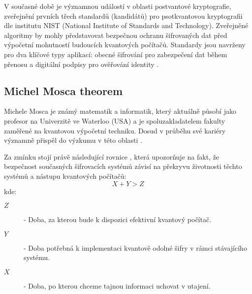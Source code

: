 V současné době je významnou událostí v oblasti postvantové kryptografie, zveřejnění prvních třech standardů (kandidátů) pro psotkvantovou kryptografii dle institutu NIST (National Institute of Standards and Technology). Zveřejněné algoritmy by mohly představovat bezpečnou ochranu šifrovaných dat před výpočetní mohutností budoucích kvantových počítačů. Standardy jsou navrženy pro dva klíčové typy aplikací: obecné šifrování pro zabezpečení dat během přenosu a digitální podpisy pro ověřování identity \parencite{nist2024}.

\subsection{Michel Mosca theorem}
Michele Mosca je známý matematik a informatik, který aktuálně působí jako profesor na Univerzitě ve Waterloo (USA) a je spoluzakladatelem fakulty zaměřené na kvantovou výpočetní techniku. Dosud v průběhu své kariéry významně přispěl do výzkumu v této oblasti \parencite{mosca2023}.

Za zmínku stojí právě následující rovnice \textcite{mosca2023}, která upozorňuje na fakt, že bezpečnost současných šifrovacích systémů závisí na překryvu životnosti těchto systémů a nástupu kvantových počítačů:
\begin{equation}
X + Y > Z
\end{equation}
kde:
\begin {description}
\item[$Z$] - Doba, za kterou bude k dispozici efektivní kvantový počítač.
\item[$Y$] - Doba potřebná k implementaci kvantově odolné šifry v rámci stávajícího systému.
\item[$X$] - Doba, po kterou chceme tajnou informaci uchovat v utajení.
\end {description}
\newpage